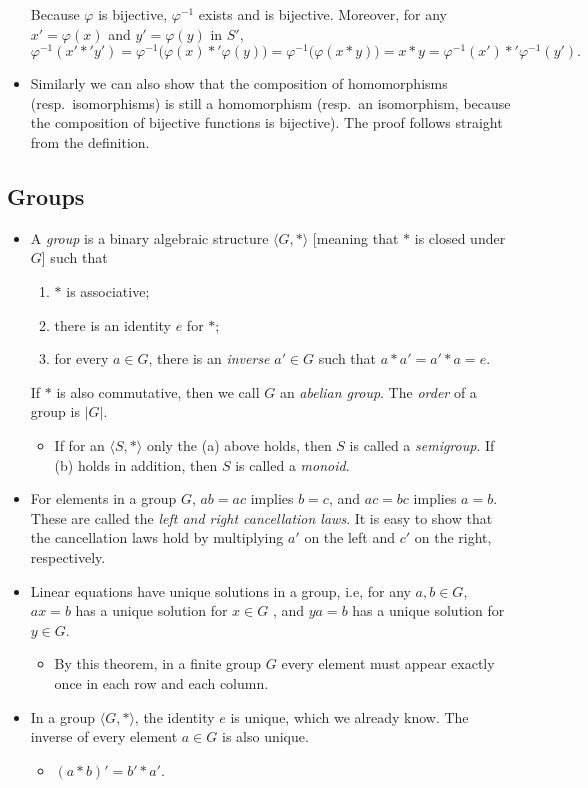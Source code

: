 \documentclass[11pt]{article}
\newcommand{\df}[1]{\textit{\textsf{#1}}}
\newcommand{\la}{\langle}
\newcommand{\ra}{\rangle}
\newcommand{\abs}[1]{\lvert #1 \rvert}
\renewcommand{\phi}{\varphi}
\begin{document}
\begin{itemize}
    Because $\phi$ is bijective, $\phi^{-1}$ exists and is bijective. Moreover, for any $x' = \phi(x)$ and $y' = \phi(y)$ in $S'$, \[\phi^{-1}(x' \ast' y') = \phi^{-1}\bigl(\phi(x) \ast' \phi(y)\bigr) = \phi^{-1}\bigl(\phi(x \ast y)\bigr) = x \ast y = \phi^{-1}(x') \ast' \phi^{-1}(y').\]
    \item Similarly we can also show that the composition of homomorphisms (resp.\ isomorphisms) is still a homomorphism (resp.\ an isomorphism, because the composition of bijective functions is bijective). The proof follows straight from the definition.
\end{itemize}

\subsection{Groups}
\begin{itemize}
    \item A \df{group} is a binary algebraic structure $\la G, \ast \ra$ [meaning that $\ast$ is closed under $G$] such that
    \begin{enumerate}[label=(\alph*)]
        \item $\ast$ is associative;
        \item there is an identity $e$ for $\ast$;
        \item for every $a \in G$, there is an \df{inverse} $a' \in G$ such that $a \ast a' = a' \ast a = e$.
    \end{enumerate}
    If $\ast$ is also commutative, then we call $G$ an \df{abelian group}. The \df{order} of a group is $\abs{G}$.
    \begin{itemize}
        \item If for an $\la S,\ast \ra$ only the (a) above holds, then $S$ is called a \df{semigroup}. If (b) holds in addition, then $S$ is called a \df{monoid}.
    \end{itemize}
     \item For elements in a group $G$, $ab = ac$ implies $b = c$, and $ac = bc$ implies $a = b$. These are called the \df{left and right cancellation laws}. It is easy to show that the cancellation laws hold by multiplying $a'$ on the left and $c'$ on the right, respectively.
    \item Linear equations have unique solutions in a group, i.e, for any $a,b \in G$, $ax=b$ has a unique solution for $x \in G$ , and $ya = b$ has a unique solution for $y \in G$.
    \begin{itemize}
        \item By this theorem, in a finite group $G$ every element must appear exactly once in each row and each column.
    \end{itemize}
    \item In a group $\la G,\ast \ra$, the identity $e$ is unique, which we already know. The inverse of every element $a \in G$ is also unique.
    \begin{itemize}
        \item $(a \ast b)' = b' \ast a'$.
    \end{itemize}
\end{itemize}
\end{document}
